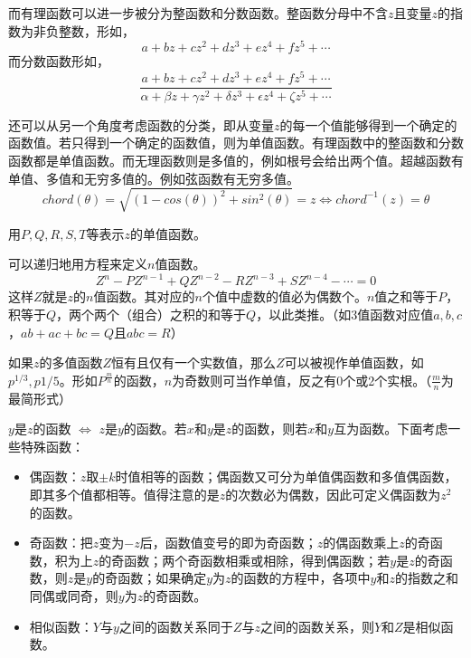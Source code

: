 \begin{note}
    而有理函数可以进一步被分为整函数和分数函数。整函数分母中不含$z$且变量$z$的指数为非负整数，形如，
    \begin{equation*}
        a + bz + cz^2 + dz^3 + ez^4 + fz^5 + \cdots
    \end{equation*}
    而分数函数形如，
    \begin{equation*}
        \frac{a + bz + cz^2 + dz^3 + ez^4 + fz^5 + \cdots}{\alpha + \beta z + \gamma z^2 + \delta z^3 + \epsilon z^4 + \zeta z^5 + \cdots}
    \end{equation*}
    
    还可以从另一个角度考虑函数的分类，即从变量$z$的每一个值能够得到一个确定的函数值。若只得到一个确定的函数值，则为单值函数。有理函数中的整函数和分数函数都是单值函数。而无理函数则是多值的，例如根号会给出两个值。超越函数有单值、多值和无穷多值的。例如弦函数有无穷多值。
    \begin{equation*}
        chord(\theta) = \sqrt{(1 - cos(\theta))^2 + sin^2(\theta)} = z \iff chord^{-1}(z) = \theta
    \end{equation*}
    
    用$P, Q, R, S, T$等表示$z$的单值函数。
    
    可以递归地用方程来定义$n$值函数。
    \begin{equation*}
        Z^n - PZ^{n-1} + QZ^{n-2} - RZ^{n-3} + SZ^{n-4} - \cdots = 0
    \end{equation*}
    这样$Z$就是$z$的$n$值函数。其对应的$n$个值中虚数的值必为偶数个。$n$值之和等于$P$，积等于$Q$，两个两个（组合）之积的和等于$Q$，以此类推。（如$3$值函数对应值$a, b, c$，$ab + ac + bc = Q$且$abc = R$）
    
    如果$z$的多值函数$Z$恒有且仅有一个实数值，那么$Z$可以被视作单值函数，如$p^{1/3}, p{1/5}$。形如$P^{\frac{m}{n}}$的函数，$n$为奇数则可当作单值，反之有0个或2个实根。（$\frac{m}{n}$为最简形式）
    
    $y$是$z$的函数 $\iff$ $z$是$y$的函数。若$x$和$y$是$z$的函数，则若$x$和$y$互为函数。下面考虑一些特殊函数：
    \begin{itemize}
        \item 偶函数：$z$取$\pm k$时值相等的函数；偶函数又可分为单值偶函数和多值偶函数，即其多个值都相等。值得注意的是$z$的次数必为偶数，因此可定义偶函数为$z^2$的函数。
        \item 奇函数：把$z$变为$-z$后，函数值变号的即为奇函数；$z$的偶函数乘上$z$的奇函数，积为上$z$的奇函数；两个奇函数相乘或相除，得到偶函数；若$y$是$z$的奇函数，则$z$是$y$的奇函数；如果确定$y$为$z$的函数的方程中，各项中$y$和$z$的指数之和同偶或同奇，则$y$为$z$的奇函数。
        \item 相似函数：$Y$与$y$之间的函数关系同于$Z$与$z$之间的函数关系，则$Y$和$Z$是相似函数。
    \end{itemize}
    
\end{note}

